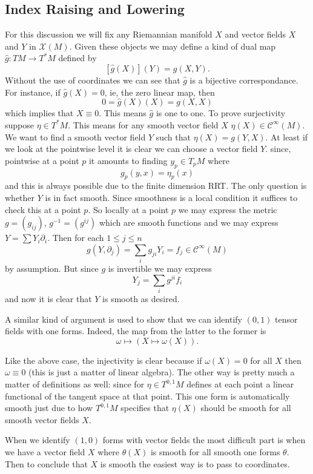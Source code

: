 \subsection{Index Raising and Lowering}

For this discussion we will fix any Riemannian manifold $X$ and vector fields $X$ and $Y$ in $\mathcal{X}(M)$. Given these objects we may define a kind of dual map $\hat{g}: TM \to T^*M$ defined by
\[[\hat{g}(X)](Y) = g(X, Y).\] Without the use of coordinates we can see that $\hat{g}$ is a bijective correspondance. For instance, if $\hat{g}(X) = 0$, ie, the zero linear map, then 
\[0 = \hat{g}(X)(X) = g(X, X)\] which implies that $X \equiv 0$. This means $\hat{g}$ is one to one. To prove surjectivity suppose $\eta \in T^*M$. This means for any smooth vector field $X$ $\eta(X) \in \mathcal{C}^\infty(M)$. We want to find a smooth vector field $Y$ such that $\eta(X) = g(Y, X)$. At least if we look at the pointwise level it is clear we can choose a vector field $Y$. since, pointwise at a point $p$ it amounts to finding $y_p \in T_pM$ where
\[g_p(y, x) = \eta_p(x)\]
and this is always possible due to the finite dimension RRT. The only question is whether $Y$ is in fact smooth. Since smoothness is a local condition it suffices to check this at a point $p$. So locally at a point $p$ we may express the metric $g = (g_{ij})$, $g^{-1} = (g^{ij})$ which are smooth functions and we may express $Y = \sum Y_i \partial_i$. Then for each $1 \leq j \leq n$
\[g(Y, \partial_j) = \sum_i g_{ji}Y_i = f_j \in \mathcal{C}^{\infty}(M)\] by assumption. But since $g$ is invertible we may express 
\[Y_j = \sum_{i}g^{ji}f_i\]
and now it is clear that $Y$ is smooth as desired.

\begin{remark}
    A similar kind of argument is used to show that we can identify $(0, 1)$ tensor fields with one forms. Indeed, the map from the latter to the former is
    \[\omega \mapsto (X \mapsto \omega(X)).\]

    Like the above case, the injectivity is clear because if $\omega(X) = 0$ for all $X$ then $\omega \equiv 0$ (this is just a matter of linear algebra). The other way is pretty much a matter of definitions as well: since for $\eta \in T^{0,1}M$ defines at each point a linear functional of the tangent space at that point. This one form is automatically smooth just due to how $T^{0,1}M$ specifies that $\eta(X)$ should be smooth for all smooth vector fields $X$.

    When we identify $(1, 0)$ forms with vector fields the most difficult part is when we have a vector field $X$ where $\theta(X)$ is smooth for all smooth one forms $\theta$. Then to conclude that $X$ is smooth the easiest way is to pass to coordinates.
\end{remark}

\printbibliography


